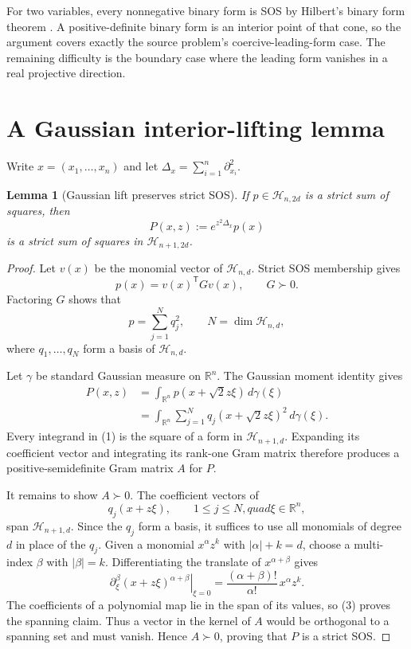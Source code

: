 \documentclass[11pt]{article}
\newtheorem{lemma}[theorem]{Lemma}
\newcommand{\R}{\mathbb R}
\newcommand{\cH}{\mathcal H}
\begin{document}
For two variables, every nonnegative binary form is SOS by Hilbert's binary
form theorem \cite{Hilbert}.  A positive-definite binary form is an interior
point of that cone, so the argument covers exactly the source problem's
coercive-leading-form case.  The remaining difficulty is the boundary case
where the leading form vanishes in a real projective direction.

\section{A Gaussian interior-lifting lemma}

Write $x=(x_1,\ldots,x_n)$ and let
$\Delta_x=\sum_{i=1}^n\partial_{x_i}^2$.

\begin{lemma}[Gaussian lift preserves strict SOS]\label{lem:lift}
If $p\in\cH_{n,2d}$ is a strict sum of squares, then
\[
  P(x,z):=e^{z^2\Delta_x}p(x)
\]
is a strict sum of squares in $\cH_{n+1,2d}$.
\end{lemma}

\begin{proof}
Let $v(x)$ be the monomial vector of $\cH_{n,d}$.  Strict SOS membership
gives
\[
  p(x)=v(x)^{\mathsf T}Gv(x),\qquad G\succ0.
\]
Factoring $G$ shows that
\[
  p=\sum_{j=1}^{N}q_j^2,
  \qquad N=\dim\cH_{n,d},
\]
where $q_1,\ldots,q_N$ form a basis of $\cH_{n,d}$.

Let $\gamma$ be standard Gaussian measure on $\R^n$.  The Gaussian moment
identity gives
\begin{align*}
 P(x,z)
 &=\int_{\R^n}p(x+\sqrt2z\xi)\,d\gamma(\xi)\\
 &=\int_{\R^n}\sum_{j=1}^{N}
       q_j(x+\sqrt2z\xi)^2\,d\gamma(\xi).
 \tag{1}
\end{align*}
Every integrand in (1) is the square of a form in $\cH_{n+1,d}$.  Expanding
its coefficient vector and integrating its rank-one Gram matrix therefore
produces a positive-semidefinite Gram matrix $A$ for $P$.

It remains to show $A\succ0$.  The coefficient vectors of
\[
  q_j(x+z\xi),\qquad 1\leq j\leq N,quad \xi\in\R^n,
  \tag{2}
\]
span $\cH_{n+1,d}$.  Since the $q_j$ form a basis, it suffices to use all
monomials of degree $d$ in place of the $q_j$.  Given a monomial
$x^\alpha z^k$ with $|\alpha|+k=d$, choose a multi-index $\beta$ with
$|\beta|=k$.  Differentiating the translate of $x^{\alpha+\beta}$ gives
\[
 \left.\partial_\xi^\beta
 (x+z\xi)^{\alpha+\beta}\right|_{\xi=0}
 =\frac{(\alpha+\beta)!}{\alpha!}\,x^\alpha z^k.
 \tag{3}
\]
The coefficients of a polynomial map lie in the span of its values, so (3)
proves the spanning claim.  Thus a vector in the kernel of $A$ would be
orthogonal to a spanning set and must vanish.  Hence $A\succ0$, proving that
$P$ is a strict SOS.
\end{proof}
\end{document}
